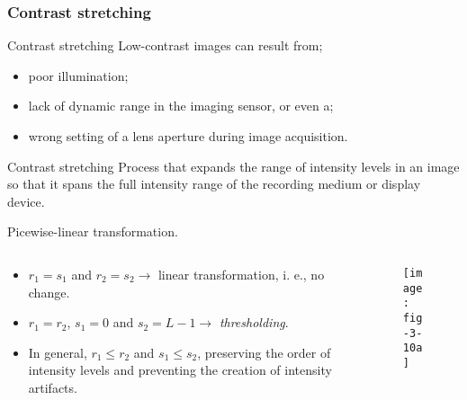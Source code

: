 
\subsubsection{Contrast stretching}


\begin{frame}{Contrast stretching}
Low-contrast images can result from;
\begin{itemize}
\item poor illumination;
\item lack of dynamic range in the imaging sensor, or even a;
\item wrong setting of a lens aperture
during image acquisition.
\end{itemize}
\begin{block}{Contrast stretching}
Process that expands the range of intensity levels in an image so that it spans the full intensity range of the recording medium or display device.
\end{block}
\end{frame}


\begin{frame}
Picewise-linear transformation.
\begin{columns}
\begin{column}{.5\textwidth}
\begin{itemize}
\item $r_{1} = s_{1}$ and $r_{2} = s_{2} \rightarrow$ linear transformation, i. e., no change.
\item $r_{1} = r_{2}$, $s_{1} = 0$ and $s_{2} = L-1 \rightarrow$ \textit{thresholding}.
\item In general, $r_{1} \leq r_{2}$ and $s_{1} \leq s_{2}$, preserving the order of intensity levels and preventing the creation of intensity artifacts.
\end{itemize}
\end{column}
\begin{column}{.5\textwidth}
\begin{figure}
\centering
\texttt{[image: fig-3-10a]}
\end{figure}
\end{column}
\end{columns}
\end{frame}

